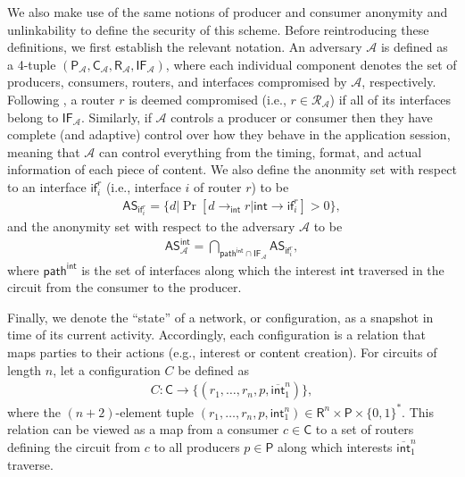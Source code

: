 \documentclass[10pt]{article}
\begin{document}
We also make use of the same notions of producer and consumer anonymity and unlinkability to define the security of this scheme. Before reintroducing these definitions, we first establish the relevant notation. An adversary $\mathcal{A}$ is defined as a 4-tuple $(\mathsf{P}_{\mathcal{A}}, \mathsf{C}_{\mathcal{A}}, \mathsf{R}_{\mathcal{A}}, \mathsf{IF}_{\mathcal{A}})$, where each individual component denotes the set of producers, consumers, routers, and interfaces compromised by $\mathcal{A}$, respectively. Following \cite{andana}, a router $r$ is deemed compromised (i.e., $r \in \mathcal{R}_{\mathcal{A}}$) if all of its interfaces belong to $\mathsf{IF}_{\mathcal{A}}$. Similarly, if $\mathcal{A}$ controls a producer or consumer then they have complete (and adaptive) control over how they behave in the application session, meaning that $\mathcal{A}$ can control everything from the timing, format, and actual information of each piece of content. We also define the anonmity set with respect to an interface $\mathsf{if}_i^r$ (i.e., interface $i$ of router $r$) to be 
\begin{align*}
\mathsf{AS}_{\mathsf{if}_{i}^{r}} = \{d | \Pr[d \to_\mathsf{int} r | \mathsf{int} \to \mathsf{if}_i^r] > 0 \},
\end{align*}
and the anonymity set with respect to the adversary $\mathcal{A}$ to be
\begin{align*}
\mathsf{AS}_{\mathcal{A}}^{\mathsf{int}} = \bigcap_{\mathsf{path}^{\mathsf{int}} \cap \mathsf{IF}_{\mathcal{A}}} \mathsf{AS}_{\mathsf{if}_{i}^{r}},
\end{align*}
where $\mathsf{path}^{\mathsf{int}}$ is the set of interfaces along which the interest $\mathsf{int}$ traversed in the circuit from the consumer to the producer. 

Finally, we denote the ``state'' of a network, or configuration, as a snapshot in time of its current activity. Accordingly, each configuration is a relation that maps parties to their actions (e.g., interest or content creation). For circuits of length $n$, let a configuration $C$ be defined as
\begin{align*}
C : \mathsf{C} \to \{(r_1,\dots,r_n,p,\overline{\mathsf{int}}_1^n)\},
\end{align*}
where the $(n + 2)$-element tuple $(r_1,\dots,r_n,p,\mathsf{int}_1^n) \in \mathsf{R}^n \times \mathsf{P} \times \{0,1\}^*$. This relation can be viewed as a map from a consumer $c \in \mathsf{C}$ to a set of routers defining the circuit from $c$ to all producers $p \in \mathsf{P}$ along which interests $\overline{\mathsf{int}}_1^n$ traverse. 
\end{document}

